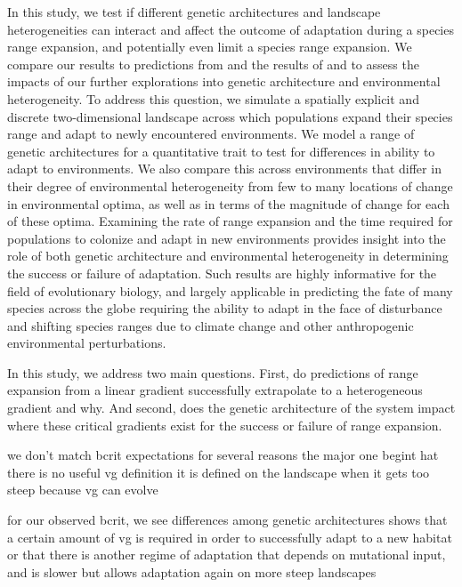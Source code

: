 In this study, we test if different genetic architectures and landscape heterogeneities can interact and affect the outcome of adaptation during a species range expansion, and potentially even limit a species range expansion. We compare our results to predictions from \citet{Barton:2001} and the results of \citet{Bridle:2010} and \citet{Schiffers:2014} to assess the impacts of our further explorations into genetic architecture and environmental heterogeneity. 
To address this question, we simulate a spatially explicit and discrete two-dimensional landscape across which populations expand their species range and adapt to newly encountered environments. We model a range of genetic architectures for a quantitative trait to test for differences in ability to adapt to environments. We also compare this across environments that differ in their degree of environmental heterogeneity from few to many locations of change in environmental optima, as well as in terms of the magnitude of change for each of these optima. Examining the rate of range expansion and the time required for populations to colonize and adapt in new environments provides insight into the role of both genetic architecture and environmental heterogeneity in determining the success or failure of adaptation. Such results are highly informative for the field of evolutionary biology, and largely applicable in predicting the fate of many species across the globe requiring the ability to adapt in the face of disturbance and shifting species ranges due to climate change and other anthropogenic environmental perturbations.

In this study, we address two main questions. First, do predictions of range expansion from a linear gradient successfully extrapolate to a heterogeneous gradient and why. And second, does the genetic architecture of the system impact where these critical gradients exist for the success or failure of range expansion.





we don't match bcrit expectations for several reasons
the major one begint hat there is no useful vg definition
it is defined on the landscape when it gets too steep
because vg can evolve

for our observed bcrit, we see differences among genetic architectures
shows that a certain amount of vg is required in order to successfully adapt to a new habitat
or that there is another regime of adaptation that depends on mutational input, and is slower but allows adaptation again on more steep landscapes


